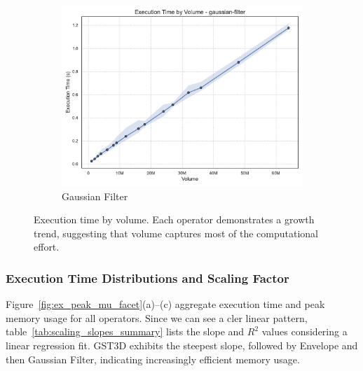 \begin{figure}[htbp]
\begin{subfigure}[t]{0.32\textwidth}
        \includegraphics[width=\textwidth]{assets/images/05/execution_time_by_volume_gaussian-filter}
        \caption{Gaussian Filter}
    \end{subfigure}
    \caption{Execution time by volume. Each operator demonstrates a growth trend, suggesting that volume captures most of the computational effort.}
    \label{fig:execution_time_by_volume_facet}
\end{figure}

\subsubsection{Execution Time Distributions and Scaling Factor}
\label{subsec:execution-time-distributions-and-scaling}

Figure~\ref{fig:ex_peak_mu_facet}(a)--(c) aggregate execution time and peak memory usage for all operators.
Since we can see a cler linear pattern, table~\ref{tab:scaling_slopes_summary} lists the slope and $R^2$ values considering a linear regression fit.
\ac{GST3D} exhibits the steepest slope, followed by Envelope and then Gaussian Filter, indicating increasingly efficient memory usage.

